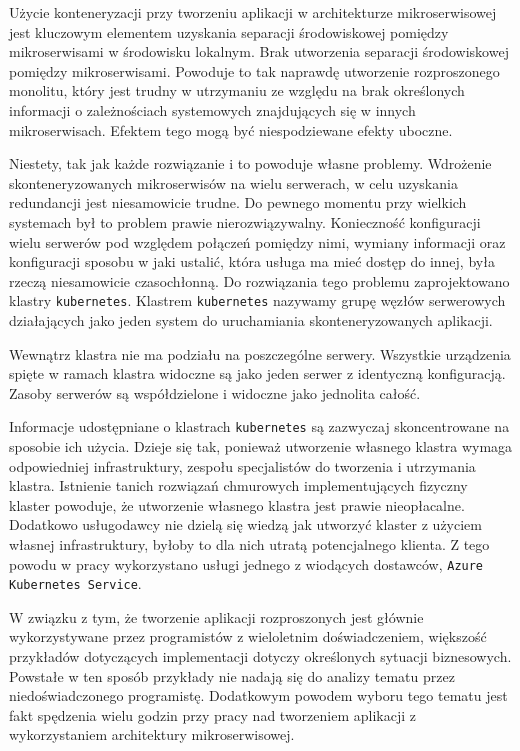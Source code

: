 \documentclass[12pt,twoside]{article}
\begin{document}
Użycie konteneryzacji przy tworzeniu aplikacji w architekturze mikroserwisowej jest kluczowym elementem uzyskania separacji środowiskowej pomiędzy mikroserwisami w środowisku lokalnym. Brak utworzenia separacji środowiskowej pomiędzy mikroserwisami. Powoduje to tak naprawdę utworzenie rozproszonego monolitu, który jest trudny w utrzymaniu ze względu na brak określonych informacji o zależnościach systemowych znajdujących się w innych mikroserwisach. Efektem tego mogą być niespodziewane efekty uboczne.

Niestety, tak jak każde rozwiązanie i to powoduje własne problemy. Wdrożenie skonteneryzowanych mikroserwisów na wielu serwerach, w celu uzyskania redundancji jest niesamowicie trudne. Do pewnego momentu przy wielkich systemach był to problem prawie nierozwiązywalny. Konieczność konfiguracji wielu serwerów pod względem połączeń pomiędzy nimi, wymiany informacji oraz konfiguracji sposobu w jaki ustalić, która usługa ma mieć dostęp do innej, była rzeczą niesamowicie czasochłonną. Do rozwiązania tego problemu zaprojektowano klastry \texttt{kubernetes}. Klastrem \texttt{kubernetes} nazywamy grupę węzłów serwerowych działających jako jeden system do uruchamiania skonteneryzowanych aplikacji\cite{cluster}.

Wewnątrz klastra nie ma podziału na poszczególne serwery. Wszystkie urządzenia spięte w ramach klastra widoczne są jako jeden serwer z identyczną konfiguracją. Zasoby serwerów są współdzielone i widoczne jako jednolita całość. 

Informacje udostępniane o klastrach \texttt{kubernetes} są zazwyczaj skoncentrowane na sposobie ich użycia. Dzieje się tak, ponieważ utworzenie własnego klastra wymaga odpowiedniej infrastruktury, zespołu specjalistów do tworzenia i utrzymania klastra. Istnienie tanich rozwiązań chmurowych implementujących fizyczny klaster powoduje, że utworzenie własnego klastra jest prawie nieopłacalne. Dodatkowo usługodawcy nie dzielą się wiedzą jak utworzyć klaster z użyciem własnej infrastruktury, byłoby to dla nich utratą potencjalnego klienta. Z tego powodu w pracy wykorzystano usługi jednego z wiodących dostawców, \texttt{Azure Kubernetes Service}.

 W związku z tym, że tworzenie aplikacji rozproszonych jest głównie wykorzystywane przez programistów z wieloletnim doświadczeniem, większość przykładów dotyczących implementacji dotyczy określonych sytuacji biznesowych. Powstałe w ten sposób przykłady nie nadają się do analizy tematu przez niedoświadczonego programistę. Dodatkowym powodem wyboru tego tematu jest fakt spędzenia wielu godzin przy pracy nad tworzeniem aplikacji z wykorzystaniem architektury mikroserwisowej.
\end{document}
